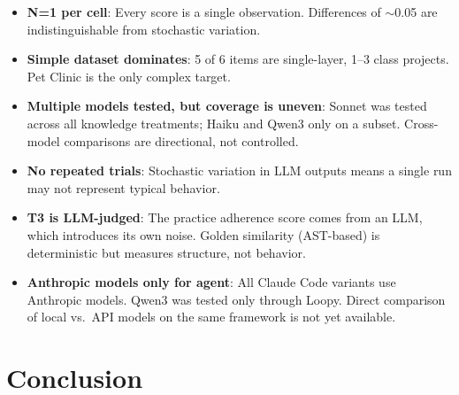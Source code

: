\documentclass[11pt,a4paper]{article}
\begin{document}
\begin{itemize}
  \item \textbf{N=1 per cell}: Every score is a single observation. Differences of $\sim$0.05 are indistinguishable from stochastic variation.
  \item \textbf{Simple dataset dominates}: 5 of 6 items are single-layer, 1--3 class projects. Pet Clinic is the only complex target.
  \item \textbf{Multiple models tested, but coverage is uneven}: Sonnet was tested across all knowledge treatments; Haiku and Qwen3 only on a subset. Cross-model comparisons are directional, not controlled.
  \item \textbf{No repeated trials}: Stochastic variation in LLM outputs means a single run may not represent typical behavior.
  \item \textbf{T3 is LLM-judged}: The practice adherence score comes from an LLM, which introduces its own noise. Golden similarity (AST-based) is deterministic but measures structure, not behavior.
  \item \textbf{Anthropic models only for agent}: All Claude Code variants use Anthropic models. Qwen3 was tested only through Loopy. Direct comparison of local vs.\ API models on the same framework is not yet available.
\end{itemize}

\section{Conclusion}
\end{document}
